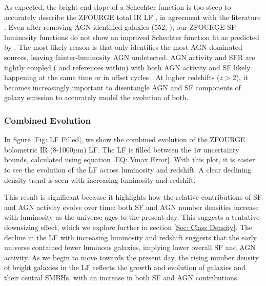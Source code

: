 As expected, the bright-end slope of a Schechter function is too steep to accurately describe the ZFOURGE total IR LF \citep{wu_mid-infrared_2011}, in agreement with the literature \citep{rodighiero_mid-_2010, gruppioni_herschel_2013, symeonidis_what_2019}. Even after removing AGN-identified galaxies (552, \citealp{cowley_zfourge_2016}), our ZFOURGE SF luminosity functions do not show an improved Schechter function fit as predicted by \cite{fu_decomposing_2010, wu_mid-infrared_2011}. The most likely reason is that \cite{cowley_zfourge_2016} only identifies the most AGN-dominated sources, leaving fainter-luminosity AGN undetected. AGN activity and SFR are tightly coupled (\citealp{alexander_what_2012} and references within) with both AGN activity and SF likely happening at the same time or in offset cycles \citep{cowley_decoupled_2018}. At higher redshifts ($z > 2$), it becomes increasingly important to disentangle AGN and SF components of galaxy emission to accurately model the evolution of both.

\subsubsection{Combined Evolution}
In figure \ref{Fig: LF Filled}, we show the combined evolution of the ZFOURGE bolometric IR (8-1000$\mu$m) LF. The LF is filled between the $1\sigma$ uncertainty bounds, calculated using equation \ref{EQ: Vmax Error}. With this plot, it is easier to see the evolution of the LF across luminosity and redshift. A clear declining density trend is seen with increasing luminosity and redshift.

This result is significant because it highlights how the relative contributions of SF and AGN activity evolve over time: both SF and AGN number densities increase with luminosity as the universe ages to the present day. This suggests a tentative downsizing effect, which we explore further in section \ref{Sec: Class Density}. The decline in the LF with increasing luminosity and redshift suggests that the early universe contained fewer luminous galaxies, implying lower overall SF and AGN activity. As we begin to move towards the present day, the rising number density of bright galaxies in the LF reflects the growth and evolution of galaxies and their central SMBHs, with an increase in both SF and AGN contributions.


